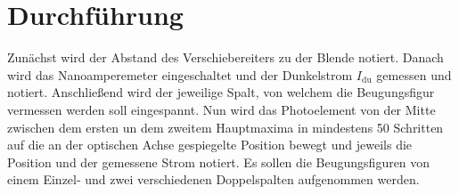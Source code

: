 
\section{Durchführung}
\label{sec:Durchführung}
Zunächst wird der Abstand des Verschiebereiters zu der Blende notiert. Danach wird das Nanoamperemeter eingeschaltet und der Dunkelstrom $I_\text{du}$ gemessen und notiert. Anschließend wird der jeweilige Spalt, von welchem die Beugungsfigur vermessen werden soll eingespannt. Nun wird das Photoelement von der Mitte zwischen dem ersten un dem zweitem Hauptmaxima in mindestens 50 Schritten auf die an der optischen Achse gespiegelte Position bewegt und jeweils die Position und der gemessene Strom notiert. Es sollen die Beugungsfiguren von einem Einzel- und zwei verschiedenen Doppelspalten aufgenommen werden.